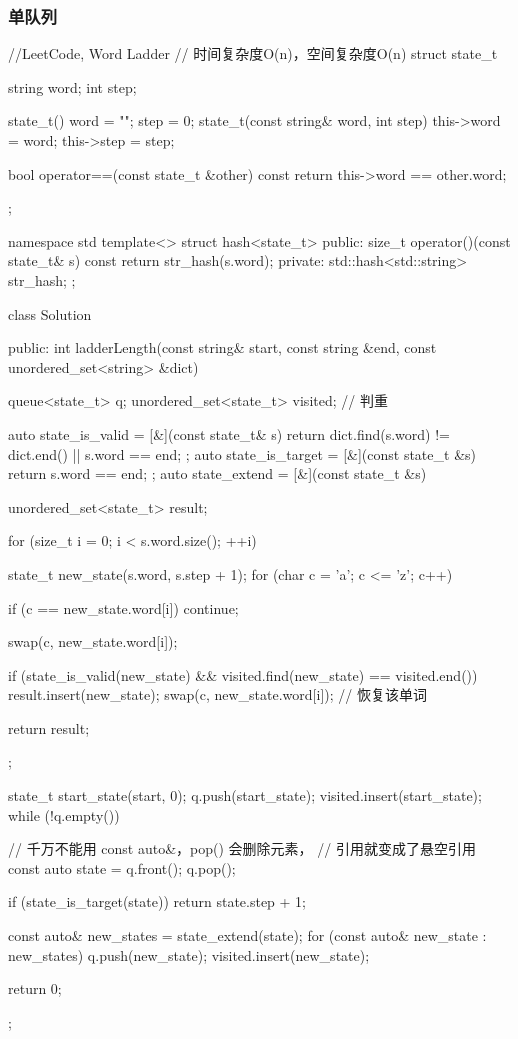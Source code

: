 \subsubsection{单队列}
\begin{Code}
//LeetCode, Word Ladder
// 时间复杂度O(n)，空间复杂度O(n)
struct state_t {
    string word;
    int step;

    state_t() { word = ""; step = 0; }
    state_t(const string& word, int step) {
        this->word = word;
        this->step = step;
    }

    bool operator==(const state_t &other) const {
        return this->word == other.word;
    }
};

namespace std {
    template<> struct hash<state_t> {
    public:
        size_t operator()(const state_t& s) const {
            return str_hash(s.word);
        }
    private:
        std::hash<std::string> str_hash;
    };
}


class Solution {
public:
    int ladderLength(const string& start, const string &end,
            const unordered_set<string> &dict) {
        queue<state_t> q;
        unordered_set<state_t> visited;  // 判重

        auto state_is_valid = [&](const state_t& s) {
            return dict.find(s.word) != dict.end() || s.word == end;
        };
        auto state_is_target = [&](const state_t &s) {return s.word == end; };
        auto state_extend = [&](const state_t &s) {
            unordered_set<state_t> result;

            for (size_t i = 0; i < s.word.size(); ++i) {
                state_t new_state(s.word, s.step + 1);
                for (char c = 'a'; c <= 'z'; c++) {
                    if (c == new_state.word[i]) continue;

                    swap(c, new_state.word[i]);

                    if (state_is_valid(new_state) &&
                        visited.find(new_state) == visited.end()) {
                        result.insert(new_state);
                    }
                    swap(c, new_state.word[i]); // 恢复该单词
                }
            }

            return result;
        };

        state_t start_state(start, 0);
        q.push(start_state);
        visited.insert(start_state);
        while (!q.empty()) {
            // 千万不能用 const auto&，pop() 会删除元素，
            // 引用就变成了悬空引用
            const auto state = q.front();
            q.pop();

            if (state_is_target(state)) {
                return state.step + 1;
            }

            const auto& new_states = state_extend(state);
            for (const auto& new_state : new_states) {
                q.push(new_state);
                visited.insert(new_state);
            }
        }
        return 0;
    }
};
\end{Code}


